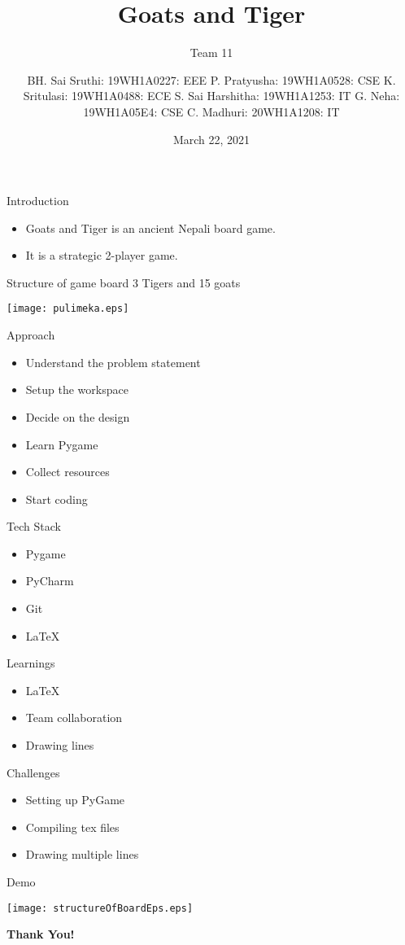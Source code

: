 \documentclass[14pt]{beamer}
\title{Goats and Tiger}
\subtitle{Team 11}
\author[]{BH. Sai Sruthi: 19WH1A0227: EEE \newline P. Pratyusha: 19WH1A0528: CSE \newline K. Sritulasi: 19WH1A0488: ECE \newline S. Sai Harshitha: 19WH1A1253: IT \newline G. Neha: 19WH1A05E4: CSE \newline C. Madhuri: 20WH1A1208: IT}
\date{March 22, 2021}
\begin{document}
\begin{frame}
	\titlepage
\end{frame}
\begin{frame}{Introduction}
	\begin{itemize}
		\item Goats and Tiger is an ancient Nepali board game.
		\item It is a strategic 2-player game.
	\end{itemize}
\end{frame}

\begin{frame}{Structure of game board}
	3 Tigers and 15 goats
	\begin{center}
		\texttt{[image: pulimeka.eps]}
	\end{center}
\end{frame}
\begin{frame}{Approach}
	\begin{itemize}
		\item Understand the problem statement
		\item Setup the workspace
		\item Decide on the design
		\item Learn Pygame
		\item Collect resources
		\item Start coding
	\end{itemize}
\end{frame}

\begin{frame}{Tech Stack}
	\begin{itemize}
		\item Pygame
        	\item PyCharm
		\item Git
        	\item LaTeX
	\end{itemize}
\end{frame}

\begin{frame}{Learnings}
	\begin{itemize}
		\item LaTeX
		\item Team collaboration
		\item Drawing lines
	\end{itemize}
\end{frame}

\begin{frame}{Challenges}
	\begin{itemize}
		\item Setting up PyGame
		\item Compiling tex files
		\item Drawing multiple lines
	\end{itemize}
\end{frame}

\begin{frame}{Demo}
	\begin{center}
		\texttt{[image: structureOfBoardEps.eps]}
	\end{center}
\end{frame}


\begin{frame}
	\begin{center}
	\textbf{\huge Thank You!}
	\end{center}
\end{frame}
\end{document}
